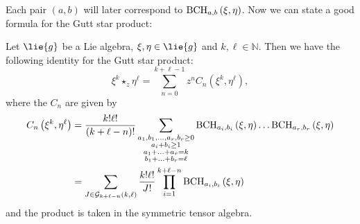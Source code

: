 Each pair $(a,b)$ will later correspond to $\mathrm{BCH}_{a, b}\left(\xi, \eta\right)$.
Now we can state a good formula for the Gutt star product:
\begin{lemma}
	\label{Formulas:Lemma:2MonomialsFormula1}
	Let $\lie{g}$ be a Lie algebra, $\xi, \eta \in \lie{g}$ and $k, 
	\ell \in \mathbb{N}$. Then we have the following identity for the 
	Gutt star product:
	\begin{equation*}
    	\xi^k \star_z \eta^{\ell}
    	=
	    \sum\limits_{n=0}^{k + \ell -1}
    	z^n
    	C_n \left( \xi^k, \eta^{\ell} \right),
	\end{equation*}
	where the $C_n$ are given by
	\begin{align}
		\label{Formulas:2MonomialsExplicit}
        C_n \left( \xi^k, \eta^{\ell} \right)
        & =
        \frac{k! \ell!}{(k + \ell - n)!}
        \sum\limits_{\substack{a_1, b_1, \ldots, a_r, b_r \geq 0 \\
            a_i + b_i \geq 1 \\
            a_1 + \ldots + a_r = k \\
            b_1 + \ldots + b_r = \ell
        }}
        \mathrm{BCH}_{a_i, b_i}\left(\xi, \eta\right)
        \ldots
        \mathrm{BCH}_{a_r, b_r}\left(\xi, \eta\right)
        \\
        \label{Formulas:2MonomialsFormula1}
        & =
        \sum\limits_{J \in \mathcal{G}_{k + \ell - n}(k, \ell)}
        \frac{k! \ell!}{J!}
        \prod\limits_{i = 1}^{k + \ell - n}        
        \mathrm{BCH}_{a_i, b_i}\left(\xi, \eta\right)
	\end{align}
	and the product is taken in the symmetric tensor algebra.
\end{lemma}

